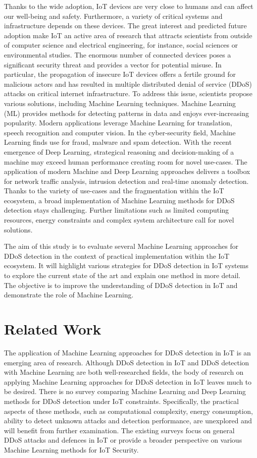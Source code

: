 \documentclass[conference]{IEEEtran}
\begin{document}
Thanks to the wide adoption, IoT devices are very close to humans and can affect our well-being and safety.
Furthermore, a variety of critical systems and infrastructure depends on these devices.
The great interest and predicted future adoption make IoT an active area of research that attracts scientists from outside of computer science and electrical engineering, for instance, social sciences or environmental studies.
The enormous number of connected devices poses a significant security threat and provides a vector for potential misuse.
In particular, the propagation of insecure IoT devices offers a fertile ground for malicious actors and has resulted in multiple distributed denial of service (DDoS) attacks on critical internet infrastructure.
To address this issue, scientists propose various solutions, including Machine Learning techniques.
Machine Learning (ML) provides methods for detecting patterns in data and enjoys ever-increasing popularity.
Modern applications leverage Machine Learning for translation, speech recognition and computer vision.
In the cyber-security field, Machine Learning finds use for fraud, malware and spam detection.
With the recent emergence of Deep Learning, strategical reasoning and decision-making of a machine may exceed human performance creating room for novel use-cases.
The application of modern Machine and Deep Learning approaches delivers a toolbox for network traffic analysis, intrusion detection and real-time anomaly detection.
Thanks to the variety of use-cases and the fragmentation within the IoT ecosystem, a broad implementation of Machine Learning methods for DDoS detection stays challenging.
Further limitations such as limited computing resources, energy constraints and complex system architecture call for novel solutions.

The aim of this study is to evaluate several Machine Learning approaches for DDoS detection in the context of practical implementation within the IoT ecosystem.
It will highlight various strategies for DDoS detection in IoT systems to explore the current state of the art and explain one method in more detail.
The objective is to improve the understanding of DDoS detection in IoT and demonstrate the role of Machine Learning.

\section{Related Work}
The application of Machine Learning approaches for DDoS detection in IoT is an emerging area of research.
Although DDoS detection in IoT and DDoS detection with Machine Learning are both well-researched fields, the body of research on applying Machine Learning approaches for DDoS detection in IoT leaves much to be desired.
There is no survey comparing Machine Learning and Deep Learning methods for DDoS detection under IoT constraints.
Specifically, the practical aspects of these methods, such as computational complexity, energy consumption, ability to detect unknown attacks and detection performance, are unexplored and will benefit from further examination.
The existing surveys focus on general DDoS attacks and defences in IoT or provide a broader perspective on various Machine Learning methods for IoT Security.
\end{document}

